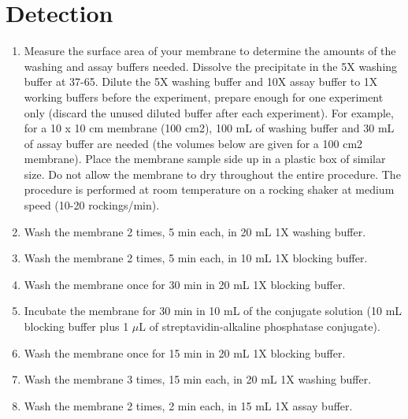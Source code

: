 \documentclass{article}
\newcommand{\mul}{\ensuremath{\mu}L\xspace}
\newcommand{\degC}{\celsius\xspace}
\begin{document}
\section*{Detection}
\label{sec:detect}


\begin{enumerate}[resume]
  \item Measure the surface area of your membrane to determine the amounts of the washing and assay buffers needed. Dissolve the precipitate in the 5X washing buffer at 37-65\degC. Dilute the 5X washing buffer and 10X assay buffer to 1X working buffers before the experiment, prepare enough for one experiment only (discard the unused diluted buffer after each experiment). For example, for a 10 x 10 cm membrane (100 cm2), 100 mL of washing buffer and 30 mL of assay buffer are needed (the volumes below are given for a 100 cm2 membrane). Place the membrane sample side up in a plastic box of similar size. Do not allow the membrane to dry throughout the entire procedure. The procedure is performed at room temperature on a rocking shaker at medium speed (10-20 rockings/min).
\item Wash the membrane 2 times, 5 min each, in 20 mL 1X washing buffer. 
\item Wash the membrane 2 times, 5 min each, in 10 mL 1X blocking buffer.
\item Wash the membrane once for 30 min in 20 mL 1X blocking buffer. 
\item Incubate the membrane for 30 min in 10 mL of the conjugate solution (10 mL
blocking buffer plus 1 \mul of streptavidin-alkaline phosphatase conjugate).   
\item Wash the membrane once for 15 min in 20 mL 1X blocking buffer. 
\item Wash the membrane 3 times, 15 min each, in 20 mL 1X washing buffer. 
\item Wash the membrane 2 times, 2 min each, in 15 mL 1X assay buffer. 

\end{enumerate}
\end{document}
